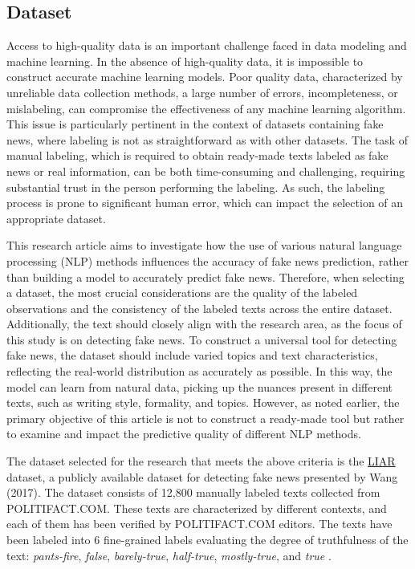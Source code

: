 \subsection{Dataset}

Access to high-quality data is an important challenge faced in data modeling and machine learning. In the absence of high-quality data, it is impossible to construct accurate machine learning models. Poor quality data, characterized by unreliable data collection methods, a large number of errors, incompleteness, or mislabeling, can compromise the effectiveness of any machine learning algorithm. This issue is particularly pertinent in the context of datasets containing fake news, where labeling is not as straightforward as with other datasets. The task of manual labeling, which is required to obtain ready-made texts labeled as fake news or real information, can be both time-consuming and challenging, requiring substantial trust in the person performing the labeling. As such, the labeling process is prone to significant human error, which can impact the selection of an appropriate dataset.

This research article aims to investigate how the use of various natural language processing (NLP) methods influences the accuracy of fake news prediction, rather than building a model to accurately predict fake news. Therefore, when selecting a dataset, the most crucial considerations are the quality of the labeled observations and the consistency of the labeled texts across the entire dataset. Additionally, the text should closely align with the research area, as the focus of this study is on detecting fake news. To construct a universal tool for detecting fake news, the dataset should include varied topics and text characteristics, reflecting the real-world distribution as accurately as possible. In this way, the model can learn from natural data, picking up the nuances present in different texts, such as writing style, formality, and topics. However, as noted earlier, the primary objective of this article is not to construct a ready-made tool but rather to examine and impact the predictive quality of different NLP methods. 

The dataset selected for the research that meets the above criteria is the \href{https://huggingface.co/datasets/liar}{LIAR} dataset, a publicly available dataset for detecting fake news presented by Wang (2017). The dataset consists of 12,800 manually labeled texts collected from POLITIFACT.COM. These texts are characterized by different contexts, and each of them has been verified by POLITIFACT.COM editors. The texts have been labeled into 6 fine-grained labels evaluating the degree of truthfulness of the text: \textit{pants-fire}, \textit{false}, \textit{barely-true}, \textit{half-true}, \textit{mostly-true}, and \textit{true} \autocite{wang-2017-liar}.

